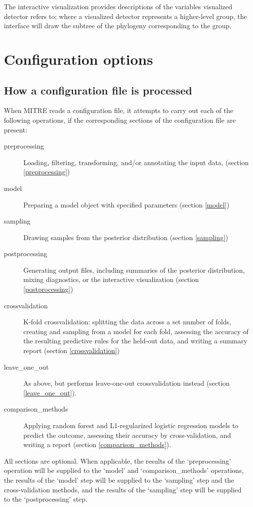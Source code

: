 \documentclass[12pt]{report}
\begin{document}
The interactive visualization provides descriptions of the variables
visualized detector refers to; where a visualized detector represents
a higher-level group, the interface will draw the subtree of the
phylogeny corresponding to the group.

\chapter{Configuration options}\label{configuration}
\section{How a configuration file is processed}
When MITRE reads a configuration file, it attempts
to carry out each of the following operations, if the
corresponding sections of the configuration file are present:

\begin{description}
\item[preprocessing] Loading, filtering, transforming, and/or
  annotating the input data, (section \ref{preprocessing})
\item[model] Preparing a model object with specified
  parameters (section \ref{model})
\item[sampling] Drawing samples from the posterior distribution (section
  \ref{sampling})
\item[postprocessing] Generating output files, including summaries of
  the posterior distribution, mixing diagnostics, or the interactive
  visualization (section \ref{postprocessing})
\item[crossvalidation] K-fold crossvalidation: splitting the data
  across a set number of folds, creating and sampling from a model for
  each fold, assessing the accuracy of the resulting predictive rules
  for the held-out data, and writing a summary report (section \ref{crossvalidation})
\item[leave\_one\_out] As above, but performs leave-one-out
  crossvalidation instead (section \ref{leave_one_out}).
\item[comparison\_methods] Applying random forest and L1-regularized
  logistic regression models to predict the outcome, assessing their
  accuracy by cross-validation, and writing a report (section
  \ref{comparison_methods}).
\end{description}

All sections are optional. When applicable, the results of the
`preprocessing' operation will be supplied to the `model'
and `comparison\_methods' operations, the results of the `model'
step will be supplied to the `sampling' step and the
cross-validation methods, and the results of the `sampling' step
will be supplied to the `postprocessing' step.
\end{document}

